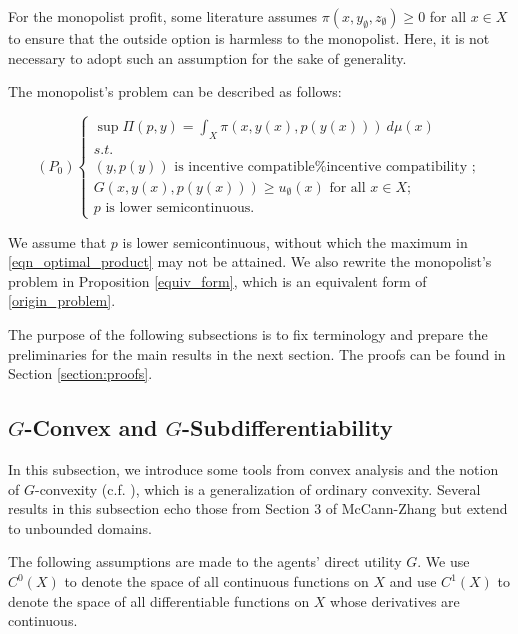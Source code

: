 \documentclass[a4paper, 11pt]{amsart}
\numberwithin{equation}{section}
\theoremstyle{plain}
\theoremstyle{definition}
\theoremstyle{remark}
\begin{document}
{For the monopolist profit, some literature assumes $\pi(x, y_{\emptyset}, z_{\emptyset}) \ge  0$ for all $x\in X$ to ensure that the outside option is harmless to the monopolist. Here, it is not necessary to adopt such an assumption for the sake of generality. \medskip} 

The monopolist's problem can be described as follows:


\begin{equation}\label{origin_problem}
(P_0)
\begin{cases}
\sup \Pi(p,y)=\int_{X} \pi(x, y(x), p(y(x)))~ d\mu(x)\\
s.t.\\
(y,p(y)) \text{~is incentive compatible%
	};\\
 G(x, y(x), p(y(x))) \ge u_{\emptyset}(x) \text{ for all } x \in X;\\
 p \text{  is lower semicontinuous}.
\end{cases}
\end{equation}

We assume that $p$ is lower semicontinuous, without which the maximum in \eqref{eqn_optimal_product} may not be attained. We also rewrite the monopolist's problem in Proposition \ref{equiv_form}, which is an equivalent form of \eqref{origin_problem}.%
\medskip

The purpose of the following subsections is to fix terminology and prepare the preliminaries for the main results in the next section.
The proofs can be found in Section \ref{section:proofs}.\medskip

\subsection{$G$-Convex and $G$-Subdifferentiability}
\label{subsection:preliminary}

In this subsection, we introduce some tools from convex analysis and the notion of $G$-convexity (c.f. \cite{Trudinger14,Balder77,Singer97}), which is a generalization of ordinary convexity. {Several results in this subsection echo those from Section 3 of McCann-Zhang \cite{McCannZhang17} but extend to unbounded domains.}  \medskip

The following assumptions are made to the agents' direct utility $G$. We use $C^0(X)$ to denote the space of all continuous functions on $X$ and use $C^1(X)$ to denote the space of all differentiable functions on $X$ whose derivatives are continuous.  \medskip
 
\end{document}
